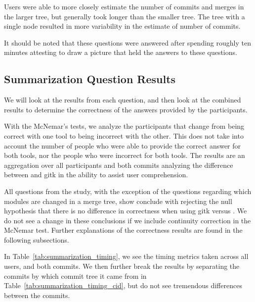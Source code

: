 Users were able to more closely estimate the number of commits and
merges in the larger tree, but generally took longer than the smaller
tree. The tree with a single node resulted in more variability in the
estimate of number of commits.

It should be noted that these questions were answered after spending
roughly ten minutes attesting to draw a picture that held the answers to
these questions.

\subsection{Summarization Question Results}

We will look at the results from each question, and then look at the
combined results to determine the correctness of the answers provided by
the participants.

With the McNemar's tests, we analyze the participants that change from
being correct with one tool to being incorrect with the other. This does
not take into account the number of people who were able to provide the
correct answer for both tools, nor the people who were incorrect for both
tools. The results are an aggregation over all participants and both
commits analyzing the difference between \tool and gitk in the ability
to assist user comprehension.

All questions from the study, with the exception of the questions
regarding which modules are changed in a merge tree, show conclude with
rejecting the null hypothesis that there is no difference in correctness
when using gitk versus \tool. We do not see a change in these
conclusions if we include continuity correction in the McNemar test.
Further explanations of the correctness results are found in the
following subsections.

In Table~\ref{tab:summarization_timing}, we see the timing metrics taken
across all users, and both commits. We then further break the results by
separating the commits by which commit tree it came from in
Table~\ref{tab:summarization_timing_cid}, but do not see tremendous
differences between the commits.

